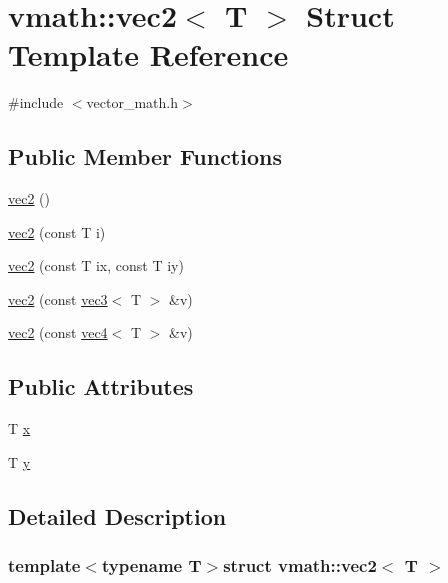 \hypertarget{structvmath_1_1vec2}{\section{vmath\-:\-:vec2$<$ T $>$ Struct Template Reference}
\label{structvmath_1_1vec2}
}


{\ttfamily \#include $<$vector\-\_\-math.\-h$>$}

\subsection*{Public Member Functions}
\begin{DoxyCompactItemize}
\item 
\hyperlink{structvmath_1_1vec2_aa50e573c993841d6715e1c22fe1f71b9}{vec2} ()
\item 
\hyperlink{structvmath_1_1vec2_a78a929d2f6accb7e7863979a7764b828}{vec2} (const T i)
\item 
\hyperlink{structvmath_1_1vec2_af2206ee266d62c9c0504c96d60b59586}{vec2} (const T ix, const T iy)
\item 
\hyperlink{structvmath_1_1vec2_a3f1f2c24fe75ba655507ae10b86884b3}{vec2} (const \hyperlink{structvmath_1_1vec3}{vec3}$<$ T $>$ \&v)
\item 
\hyperlink{structvmath_1_1vec2_a3f6a88dae69564c576d172ab829d0e7c}{vec2} (const \hyperlink{structvmath_1_1vec4}{vec4}$<$ T $>$ \&v)
\end{DoxyCompactItemize}
\subsection*{Public Attributes}
\begin{DoxyCompactItemize}
\item 
T \hyperlink{structvmath_1_1vec2_a22698bcb410dcda9d5fb5bfc1a765ba8}{x}
\item 
T \hyperlink{structvmath_1_1vec2_a5765f3cb7f8103a31abc84622fcfab87}{y}
\end{DoxyCompactItemize}


\subsection{Detailed Description}
\subsubsection*{template$<$typename T$>$struct vmath\-::vec2$<$ T $>$}



